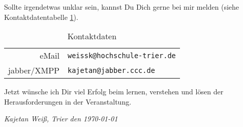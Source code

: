 Sollte irgendetwas unklar sein, kannst Du Dich gerne bei mir melden (siehe Kontaktdatentabelle \ref{kontakt}).
\begin{table}[htp]
\centering
\begin{tabular}{rl}
eMail & \texttt{weissk@hochschule-trier.de} \\
jabber/XMPP & \texttt{kajetan@jabber.ccc.de} \\ 
\end{tabular}
\caption{Kontaktdaten}
\label{kontakt}
\end{table}

Jetzt wünsche ich Dir viel Erfolg beim lernen, verstehen und lösen der Herausforderungen in der Veranstaltung.

\vspace{2cm}

\textsl{Kajetan Weiß, Trier den \today}